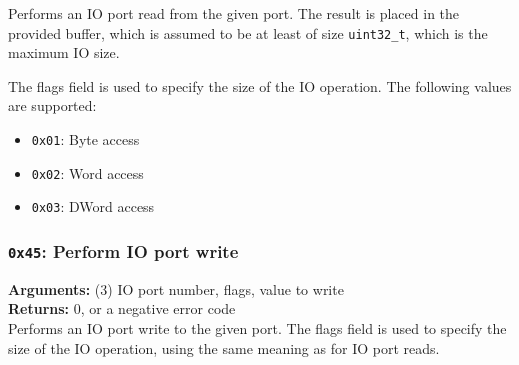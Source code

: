 \documentclass[11pt]{article}
\begin{document}
Performs an IO port read from the given port. The result is placed in the provided buffer, which is assumed to be at least of size \texttt{uint32\_t}, which is the maximum IO size.

The flags field is used to specify the size of the IO operation. The following values are supported:
\begin{itemize}
\item \texttt{0x01}: Byte access
\item \texttt{0x02}: Word access
\item \texttt{0x03}: DWord access
\end{itemize}

\subsubsection{{\tt 0x45}: Perform IO port write}
\textbf{Arguments:} (3) IO port number, flags, value to write \\
\textbf{Returns:} 0, or a negative error code \\

Performs an IO port write to the given port. The flags field is used to specify the size of the IO operation, using the same meaning as for IO port reads.
\end{document}
